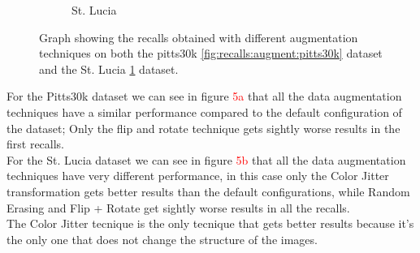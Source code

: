 \documentclass[10pt,twocolumn,letterpaper]{article}
\begin{document}
\begin{figure}[!h]
\begin{subfigure}[b]{0.23\textwidth}
			\caption{St. Lucia}
			\label{fig:recalls:augment:st_lucia}
		\end{subfigure}
		\caption{Graph showing the recalls obtained with different augmentation techniques on both the pitts30k \ref{fig:recalls:augment:pitts30k} dataset and the St. Lucia \ref{fig:recalls:augment:st_lucia} dataset.}
		\label{fig:recalls:augment}
	\end{figure}
	For the Pitts30k dataset we can see in figure \textcolor{red}{5a} that all the data augmentation techniques have a similar performance compared to the default configuration of the dataset; Only the flip and rotate technique gets sightly worse results in the first recalls.\\
	For the St. Lucia dataset we can see in figure \textcolor{red}{5b} that all the data augmentation techniques have very different performance, in this case only the Color Jitter transformation gets better results than the default configurations, while  Random Erasing and Flip + Rotate get sightly worse results in all the recalls.\\
	The Color Jitter tecnique is the only tecnique that gets better results because it's the only one that does not change the structure of the images.
	
\end{document}

